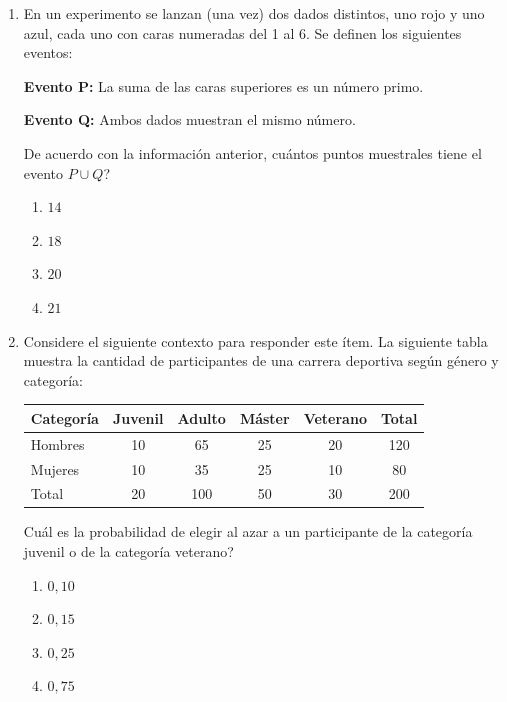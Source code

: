 \documentclass[11pt]{article}
\newcommand{\opcion}[2]{\item $#2$}
\begin{document}
\begin{enumerate}[label=\textbf{\arabic*.}, itemsep=2.5cm]
\begin{enumerate}[label=\Alph*)]
  \item $0{,}20$
  \opcion{B}{0{,}40}
  \item $0{,}60$
  \item $0{,}80$
\end{enumerate}

\Needspace{0.48\textheight}
\item
En un experimento se lanzan (una vez) dos dados distintos, uno rojo y uno azul, cada uno con caras numeradas del 1 al 6. Se definen los siguientes eventos:

\medskip
\textbf{Evento P:} La suma de las caras superiores es un n\'umero primo.

\textbf{Evento Q:} Ambos dados muestran el mismo n\'umero.
\medskip

De acuerdo con la informaci\'on anterior, \textquestiondown cu\'antos puntos muestrales tiene el evento $P \cup Q$?

\begin{enumerate}[label=\Alph*)]
  \item $14$
  \item $18$
  \opcion{C}{20}
  \item $21$
\end{enumerate}

\Needspace{0.50\textheight}
\item
Considere el siguiente contexto para responder este \'item. La siguiente tabla muestra la cantidad de participantes de una carrera deportiva seg\'un g\'enero y categor\'ia:

\begin{center}
\renewcommand{\arraystretch}{1.2}
\begin{tabular}{|l|c|c|c|c|c|}
\hline
\textbf{Categor\'ia} & \textbf{Juvenil} & \textbf{Adulto} & \textbf{M\'aster} & \textbf{Veterano} & \textbf{Total} \\
\hline
Hombres & 10 & 65 & 25 & 20 & 120 \\
Mujeres & 10 & 35 & 25 & 10 &  80 \\
\hline
Total   & 20 & 100 & 50 & 30 & 200 \\
\hline
\end{tabular}
\end{center}

\textquestiondown Cu\'al es la probabilidad de elegir al azar a un participante de la categor\'ia juvenil o de la categor\'ia veterano?

\begin{enumerate}[label=\Alph*)]
  \item $0{,}10$
  \item $0{,}15$
  \opcion{C}{0{,}25}
  \item $0{,}75$
\end{enumerate}



\end{enumerate}
\end{document}
